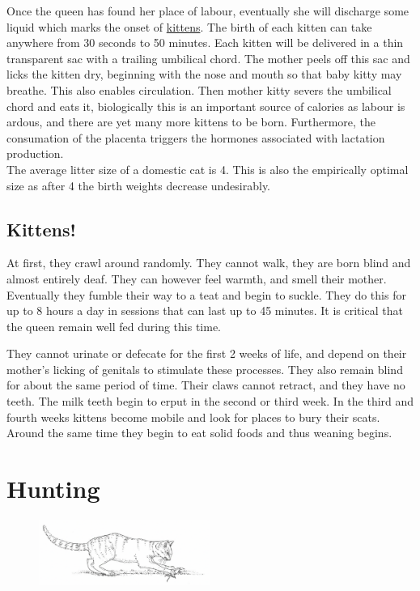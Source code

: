 \documentclass{article}
\begin{document}
\noindent{}Once the queen has found her place of labour, eventually she will discharge some liquid which marks the onset of \hyperref[sec:Kittens]{kittens}. The birth of each kitten can take anywhere from 30 seconds to 50 minutes. Each kitten will be delivered in a thin transparent sac with a trailing umbilical chord. The mother peels off this sac and licks the kitten dry, beginning with the nose and mouth so that baby kitty may breathe. This also enables circulation. Then mother kitty severs the umbilical chord and eats it, biologically this is an important source of calories as labour is ardous, and there are yet many more kittens to be born. Furthermore, the consumation of the placenta triggers the hormones associated with lactation production.\\

The average litter size of a domestic cat is 4. This is also the empirically optimal size as after 4 the birth weights decrease undesirably.


\subsection*{Kittens!}
\label{sec:Kittens}
At first, they crawl around randomly. They cannot walk, they are born blind and almost entirely deaf. They can however feel warmth, and smell their mother. Eventually they fumble their way to a teat and begin to suckle. They do this for up to 8 hours a day in sessions that can last up to 45 minutes. It is critical that the queen remain well fed during this time.

They cannot urinate or defecate for the first 2 weeks of life, and depend on their mother's licking of genitals to stimulate these processes. They also remain blind for about the same period of time. Their claws cannot retract, and they have no teeth. The milk teeth begin to erput in the second or third week. In the third and fourth weeks kittens become mobile and look for places to bury their scats. Around the same time they begin to eat solid foods and thus weaning begins.

\section*{Hunting}

\begin{figure}[h]
    \centering
    \includegraphics[width=0.5\textwidth]{img/cat-hunter.png}
\end{figure}
\end{document}
